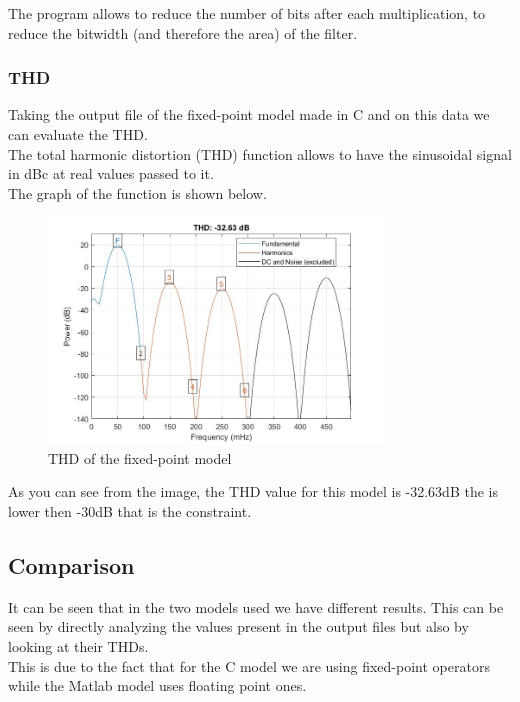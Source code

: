 The program allows to reduce the number of bits after each multiplication, to reduce the bitwidth (and therefore the area) of the filter.\\

\subsubsection{THD}
Taking the output file of the fixed-point model made in C and on this data we can evaluate the THD.\\
The total harmonic distortion (THD) function allows to have the sinusoidal signal in dBc at real values passed to it.\\
The graph of the function is shown below.\\

\begin{figure}[H]
	\centering
	\includegraphics[width=\textwidth, height=6cm]{img/thdc.jpg} 
	\caption{THD of the fixed-point model}
	\label{fig:THD} 
\end{figure}

As you can see from the image, the THD value for this model is -32.63dB the is lower then -30dB that is the constraint.\\

\subsection{Comparison}

It can be seen that in the two models used we have different results.
This can be seen by directly analyzing the values present in the output files but also by looking at their THDs.\\
This is due to the fact that for the C model we are using fixed-point operators while the Matlab model uses floating point ones.\\